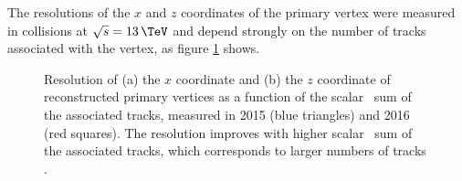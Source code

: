 The resolutions of the $x$ and $z$ coordinates of the primary vertex were measured in
collisions at $\sqrt{s}=13\,\TeV$ and depend strongly on the number of tracks
associated with the vertex, as figure \ref{fig:objects_tracks_pvres} shows.
~\vspace{-1\baselineskip}
\begin{figure}[h!]
\begin{center}
\end{center}
\caption[Resolution of the $x$ and $z$ coordinates of reconstructed
primary vertices as a function of the scalar \pT~sum of the associated
tracks.]{Resolution of (a) the $x$ coordinate and (b) the $z$ coordinate 
of reconstructed primary vertices
as a function of the scalar \pT~sum of the associated tracks, 
measured in 2015 (blue triangles) and 2016 (red squares).
The resolution improves
with higher scalar \pT~sum of the associated tracks, which corresponds to larger numbers of tracks \cite{cms-trk-dp}.}
\label{fig:objects_tracks_pvres}
\end{figure}


